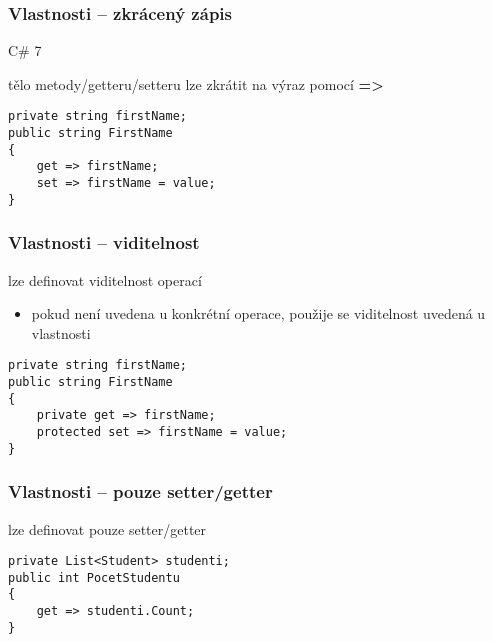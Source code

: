 \begin{frame}[fragile]
\frametitle{Vlastnosti -- zkrácený zápis}
\vfill
\begin{bitemize}{C\# 7}
\item tělo metody/getteru/setteru lze zkrátit na výraz pomocí \textbf{=>}
\end{bitemize}
\vfill
\begin{yesblock}
\begin{lstlisting}[morekeywords=value]
private string firstName;
public string FirstName
{
    get => firstName;
    set => firstName = value;
}
\end{lstlisting}
\end{yesblock}
\vfill
\end{frame}


\begin{frame}[fragile]
\frametitle{Vlastnosti -- viditelnost}
\vfill
\begin{bitemize}{}
\item lze definovat viditelnost operací
\begin{itemize}
\item pokud není uvedena u konkrétní operace, použije se viditelnost uvedená u vlastnosti
\end{itemize}

\end{bitemize}
\vfill
\begin{yesblock}
\begin{lstlisting}[morekeywords=value]
private string firstName;
public string FirstName
{
    private get => firstName;
    protected set => firstName = value;
}
\end{lstlisting}
\end{yesblock}
\vfill
\end{frame}


\begin{frame}[fragile]
\frametitle{Vlastnosti -- pouze setter/getter}
\vfill
\begin{bitemize}{}
\item lze definovat pouze setter/getter
\end{bitemize}
\vfill
\begin{yesblock}
\begin{lstlisting}
private List<Student> studenti;
public int PocetStudentu
{
    get => studenti.Count;
}
\end{lstlisting}
\end{yesblock}
\vfill
\end{frame}


